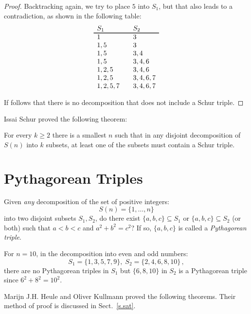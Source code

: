\begin{proof}
Backtracking again, we try to place $5$ into $S_1$, but that also leads to a contradiction, as shown in the following table:
\[
\begin{array}{l@{\hspace{2em}}l}
S_1&S_2\\\svhline
1&3\\
1,5& 3\\
1,5&3,4\\
1,5&3,4,6\\
1,2,5&3,4,6\\
1,2,5&3,4,6,7\\
1,2,5,7&3,4,6,7
\end{array}
\]

If follows that there is no decomposition that does not include a Schur triple.
\end{proof}
 Issai Schur proved the following theorem:
\begin{theorem}[Schur]
For every $k\geq 2$ there is a smallest $n$ such that in any disjoint decomposition of $S(n)$ into $k$ subsets, at least one of the subsets must contain a Schur triple.
\end{theorem}


\section{Pythagorean Triples}\label{s.pyth}

\begin{definition}
Given \emph{any} decomposition of the set of positive integers:
\[
S(n)=\{1,\ldots,n\}
\]
into two disjoint subsets $S_1,S_2$, do there exist $\{a,b,c\}\subseteq S_1$ or $\{a,b,c\}\subseteq S_2$ (or both) such that $a\!<\!b\!<\!c$ and $a^2+b^2=c^2$? If so, $\{a,b,c\}$ is called a \emph{Pythagorean triple}.
\end{definition}

\begin{example}
For $n=10$, in the decomposition into even and odd numbers:
\[
S_1 = \{1,3,5,7,9\},\; S_2=\{2,4,6,8,10\}\,,
\]
there are no Pythagorean triples in $S_1$ but $\{6,8,10\}$ in $S_2$ is a Pythagorean triple since $6^2+8^2=10^2$.
\end{example}

Marijn J.H. Heule and Oliver Kullmann proved the following theorems. Their method of proof is discussed in Sect.~\ref{s.sat}.

